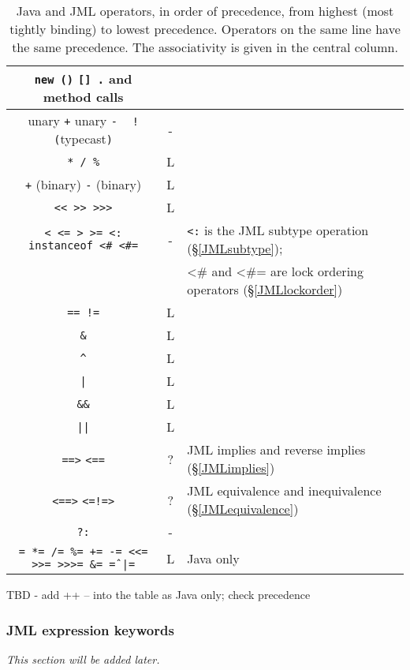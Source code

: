 \begin{table}
\begin{tabular}{|c|c|l|}
\hline
\texttt{new ()} \texttt{[] .} and method calls  \\ \hline
unary \texttt{+} unary \texttt{-} \texttt{~} \texttt{!} \texttt{(}typecast\texttt{)} & - & \\ \hline
\texttt{* / \%}  & L & \\ \hline
\texttt{+} (binary) \texttt{-} (binary) & L & \\ \hline
\texttt{<< >> >>>} & L & \\ \hline
\texttt{< <= > >= <: instanceof  <\# <\#=}  & - & \texttt{<:} is the JML subtype operation (\S\ref{JMLsubtype}); \\
						                                           & & <\# and <\#= are lock ordering operators (\S\ref{JMLlockorder}) \\ \hline
\texttt{== !=} & L & \\ \hline
\texttt{\&} & L & \\ \hline
\texttt{\^} & L &  \\ \hline
\texttt{|} & L &  \\ \hline
\texttt{\&\&} & L &  \\ \hline
\texttt{||} & L &  \\ \hline
\texttt{==>} \texttt{<==} & ? & JML implies and reverse implies (\S\ref{JMLimplies}) \\ \hline
\texttt{<==>} \texttt{<=!=>} & ? & JML equivalence and inequivalence (\S\ref{JMLequivalence}) \\ \hline
\texttt{?:} & - & \\ \hline
\texttt{= *= /= \%= += -= <<= >>= >>>= \&= \^= |=} & L & Java only\\ \hline

\end{tabular}
\label{Tab:precedence}
\caption{Java and JML operators, in order of precedence, from highest (most tightly binding) to lowest precedence. Operators on the same line have the same precedence. The associativity is given in the central column.}
\end{table}


TBD - add ++ -- into the table as Java only; check precedence

\subsubsection{JML expression keywords}
\label{JMLkeywords}
\textit{This section will be added later.} %

